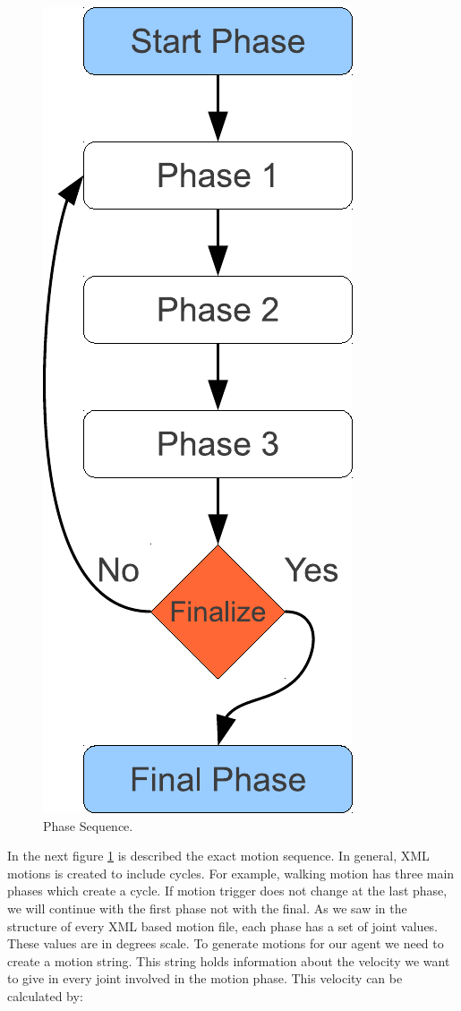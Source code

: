 \begin{figure}[htb!]
\centering
  \includegraphics[scale=0.6]{Chapter3/figures/MotionSequence.pdf}
  \caption{Phase Sequence.}
  \label{fig:PhaseSequence}
\end{figure}
In the next figure \ref{fig:PhaseSequence} is described the exact motion sequence. In general, XML motions is created to include cycles. For example, walking motion has three main phases which create a cycle. If motion trigger does not change at the last phase, we will continue with the first phase not with the final. As we saw in the structure of every XML based motion file, each phase has a set of joint values. These values are in degrees scale. To generate motions for our agent we need to create a motion string. This string holds information about the velocity we want to give in every joint involved in the motion phase. This velocity can be calculated by:
